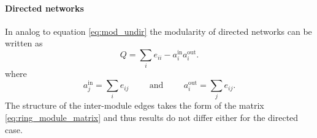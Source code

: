 \paragraph{Directed networks\color{Cayenne}{.}}
In analog to equation \eqref{eq:mod_undir} the modularity of directed networks can be written as \citep{Kao:2007}
\begin{equation}\label{eq:mod_directed}
Q=\sum _i e_{ii} - a_i ^{\text{in}} a_i ^{\text{out}}.
\end{equation}
where
\[
a_j ^\text{in}= \sum _i e_{ij} \hspace{1cm} \text{and} \hspace{1cm} a_i ^\text{out}= \sum _j e_{ij}.
\]
The structure of the inter-module edges takes the form of the matrix \eqref{eq:ring_module_matrix} and thus results do not differ either for the directed case.






%
%
%
%
%
